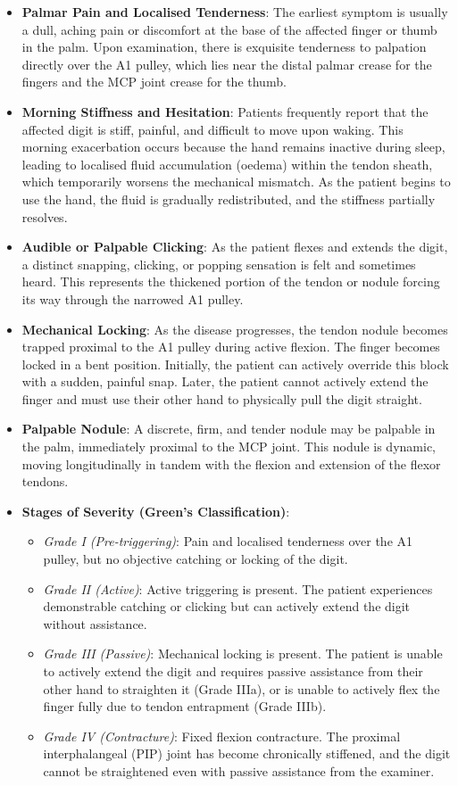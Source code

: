 \begin{itemize}
  \item \textbf{Palmar Pain and Localised Tenderness}: The earliest symptom is usually a dull, aching pain or discomfort at the base of the affected finger or thumb in the palm. Upon examination, there is exquisite tenderness to palpation directly over the A1 pulley, which lies near the distal palmar crease for the fingers and the MCP joint crease for the thumb.
  \item \textbf{Morning Stiffness and Hesitation}: Patients frequently report that the affected digit is stiff, painful, and difficult to move upon waking. This morning exacerbation occurs because the hand remains inactive during sleep, leading to localised fluid accumulation (oedema) within the tendon sheath, which temporarily worsens the mechanical mismatch. As the patient begins to use the hand, the fluid is gradually redistributed, and the stiffness partially resolves.
  \item \textbf{Audible or Palpable Clicking}: As the patient flexes and extends the digit, a distinct snapping, clicking, or popping sensation is felt and sometimes heard. This represents the thickened portion of the tendon or nodule forcing its way through the narrowed A1 pulley.
  \item \textbf{Mechanical Locking}: As the disease progresses, the tendon nodule becomes trapped proximal to the A1 pulley during active flexion. The finger becomes locked in a bent position. Initially, the patient can actively override this block with a sudden, painful snap. Later, the patient cannot actively extend the finger and must use their other hand to physically pull the digit straight.
  \item \textbf{Palpable Nodule}: A discrete, firm, and tender nodule may be palpable in the palm, immediately proximal to the MCP joint. This nodule is dynamic, moving longitudinally in tandem with the flexion and extension of the flexor tendons.
  \item \textbf{Stages of Severity (Green's Classification)}:
  \begin{itemize}
    \item \textit{Grade I (Pre-triggering)}: Pain and localised tenderness over the A1 pulley, but no objective catching or locking of the digit.
    \item \textit{Grade II (Active)}: Active triggering is present. The patient experiences demonstrable catching or clicking but can actively extend the digit without assistance.
    \item \textit{Grade III (Passive)}: Mechanical locking is present. The patient is unable to actively extend the digit and requires passive assistance from their other hand to straighten it (Grade IIIa), or is unable to actively flex the finger fully due to tendon entrapment (Grade IIIb).
    \item \textit{Grade IV (Contracture)}: Fixed flexion contracture. The proximal interphalangeal (PIP) joint has become chronically stiffened, and the digit cannot be straightened even with passive assistance from the examiner.
  \end{itemize}
\end{itemize}

